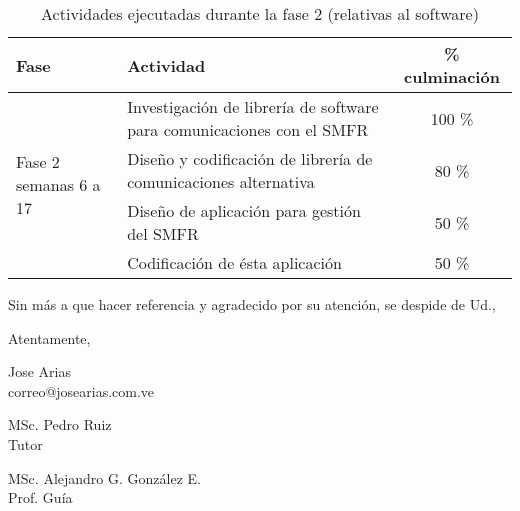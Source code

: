 \documentclass[paper=letter,oneside,fontsize=12pt, parskip=full]{article}
\begin{document}
	\begin{table}[h!]
		\begin{tabularx}{\textwidth}{p{}p{}c}
			\toprule
			{Fase} & 
			{Actividad} & 
			{\% culminación} \\
			\midrule
			\multirow{4}{0.15\textwidth}{Fase 2 \newline \small semanas 6 a 17} &
			Investigación de librería de software para comunicaciones con el SMFR & 100 \% \\
			& Diseño y codificación de librería de comunicaciones alternativa & 80 \% \\
			& Diseño de aplicación para gestión del SMFR & 50 \% \\
			& Codificación de ésta aplicación & 50 \% \\	
			\bottomrule	
		\end{tabularx}
		\caption{Actividades ejecutadas durante la fase 2 (relativas al software)}
	\end{table}	

	\newpage	

	Sin más a que hacer referencia y agradecido por su atención, se despide de Ud.,	
	
	
	\begin{flushright}
		Atentamente, 			
	
		\vspace{1.5cm}
		\begin{singlespace}
			\large
			Jose Arias \\
			{
				\small			
				correo@josearias.com.ve \\			
			}	
		\end{singlespace}
	
	\end{flushright}


	\vfill

	\begin{minipage}{0.2\textwidth}
		\centering 
		\large
		MSc. Pedro Ruiz \\
		\small
		Tutor
	\end{minipage}%
	\hfill 
	\begin{minipage}{0.4\textwidth}
		\centering \large
		MSc. Alejandro G. González E.	\\	
		\small
		Prof. Guía
	\end{minipage}
	\\
	\vfill
\end{document}
